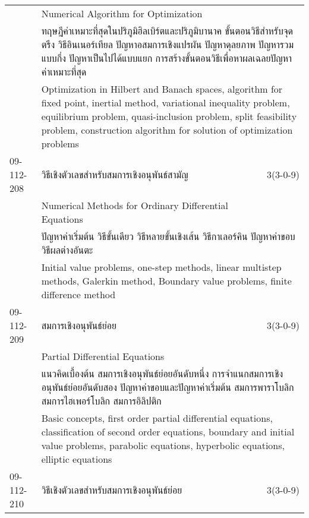 \begin{longtable}{p{}p{}r{}}
 & Numerical Algorithm for Optimization & \phantom{x} \vspace{3mm} \\*
&  \multicolumn{2}{p{0.75\textwidth}}{ทฤษฎีค่าเหมาะที่สุดในปริภูมิฮิลเบิร์ตและปริภูมิบานาค ขั้นตอนวิธีสำหรับจุดตรึง วิธีอินเนอร์เทียล ปัญหาอสมการเชิงแปรผัน ปัญหาดุลยภาพ ปัญหารวมแบบกึ่ง ปัญหาเป็นไปได้แบบแยก การสร้างขั้นตอนวิธีเพื่อหาผลเฉลยปัญหาค่าเหมาะที่สุด} \vspace{3mm} \\*
&  \multicolumn{2}{p{0.75\textwidth}}{Optimization in Hilbert and Banach spaces, algorithm for fixed point, inertial method, variational inequality problem, equilibrium problem, quasi-inclusion problem, split feasibility problem, construction algorithm for solution of optimization problems} \vspace{8mm} \\*
09-112-208 & วิธีเชิงตัวเลขสำหรับสมการเชิงอนุพันธ์สามัญ & 3(3-0-9)\\*
 & Numerical Methods for Ordinary Differential Equations & \phantom{x} \vspace{3mm} \\*
&  \multicolumn{2}{p{0.75\textwidth}}{ปัญหาค่าเริ่มต้น วิธีขั้นเดียว วิธีหลายขั้นเชิงเส้น วิธีกาเลอร์คิน ปัญหาค่าขอบ วิธีผลต่างอันตะ} \vspace{3mm} \\*
&  \multicolumn{2}{p{0.75\textwidth}}{Initial value problems, one-step methods, linear multistep methods, Galerkin method, Boundary value problems, finite difference method} \vspace{8mm} \\*
09-112-209 & สมการเชิงอนุพันธ์ย่อย & 3(3-0-9)\\*
 & Partial Differential Equations & \phantom{x} \vspace{3mm} \\*
&  \multicolumn{2}{p{0.75\textwidth}}{แนวคิดเบื้องต้น สมการเชิงอนุพันธ์ย่อยอันดับหนึ่ง การจำแนกสมการเชิงอนุพันธ์ย่อยอันดับสอง ปัญหาค่าขอบและปัญหาค่าเริ่มต้น สมการพาราโบลิก สมการไฮเพอร์โบลิก สมการอิลิปติก} \vspace{3mm} \\*
&  \multicolumn{2}{p{0.75\textwidth}}{Basic concepts, first order partial differential equations, classification of second order equations, boundary and initial value problems, parabolic equations, hyperbolic equations, elliptic equations} \vspace{8mm} \\*
09-112-210 & วิธีเชิงตัวเลขสำหรับสมการเชิงอนุพันธ์ย่อย & 3(3-0-9)\\*

\end{longtable}

